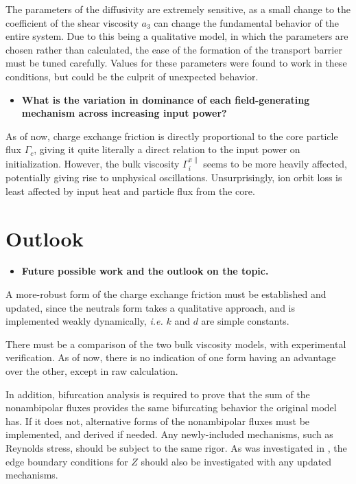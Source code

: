 The parameters of the diffusivity are extremely sensitive, as a small change to the coefficient of the shear viscosity $a_3$ can change the fundamental behavior of the entire system.
Due to this being a qualitative model, in which the parameters are chosen rather than calculated, the ease of the formation of the transport barrier must be tuned carefully.
Values for these parameters were found to work in these conditions, but could be the culprit of unexpected behavior.

\begin{itemize}
	\item \textbf{What is the variation in dominance of each field-generating mechanism across increasing input power?}
\end{itemize}
As of now, charge exchange friction is directly proportional to the core particle flux $\Gamma_c$, giving it quite literally a direct relation to the input power on initialization.
However, the bulk viscosity $\Gamma_i^{\pi\parallel}$ seems to be more heavily affected, potentially giving rise to unphysical oscillations.
Unsurprisingly, ion orbit loss is least affected by input heat and particle flux from the core.

\section{Outlook} \label{sec:outlook}
\begin{itemize}
	\item \textbf{Future possible work and the outlook on the topic.}
\end{itemize}

A more-robust form of the charge exchange friction must be established and updated, since the neutrals form takes a qualitative approach, and is implemented weakly dynamically, \emph{i.e.} $k$ and $d$ are simple constants.

There must be a comparison of the two bulk viscosity models, with experimental verification.
As of now, there is no indication of one form having an advantage over the other, except in raw calculation.

In addition, bifurcation analysis is required to prove that the sum of the nonambipolar fluxes provides the same bifurcating behavior the original model has.
If it does not, alternative forms of the nonambipolar fluxes must be implemented, and derived if needed.
Any newly-included mechanisms, such as Reynolds stress, should be subject to the same rigor.
As was investigated in \cite{paquay_studying_2012}, the edge boundary conditions for $Z$ should also be investigated with any updated mechanisms.


